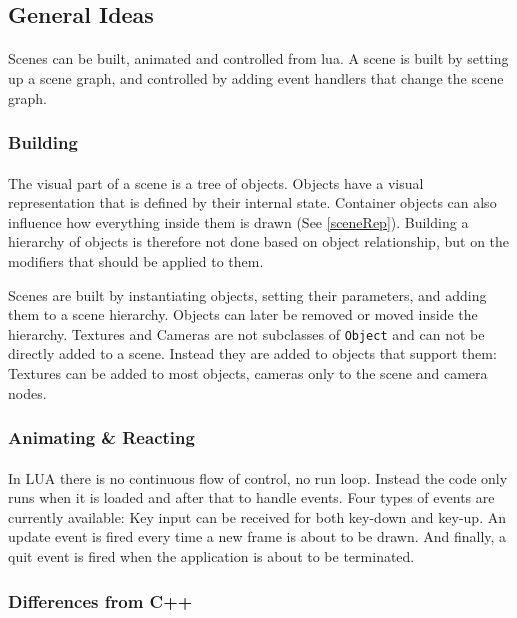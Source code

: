 \subsection{General Ideas}
\paragraph{}
Scenes can be built, animated and controlled from lua.
A scene is built by setting up a scene graph, and controlled by adding event handlers that change the scene graph.

\subsubsection{Building}
\paragraph{}
The visual part of a scene is a tree of objects.
Objects have a visual representation that is defined by their internal state.
Container objects can also influence how everything inside them is drawn (See \ref{sceneRep}).
Building a hierarchy of objects is therefore not done based on object relationship,
but on the modifiers that should be applied to them.

Scenes are built by instantiating objects, setting their parameters, and adding them to a scene hierarchy.
Objects can later be removed or moved inside the hierarchy.
Textures and Cameras are not subclasses of \lstinline{Object} and can not be directly added to a scene.
Instead they are added to objects that support them:
Textures can be added to most objects, cameras only to the scene and camera nodes.

\subsubsection{Animating \& Reacting}
\paragraph{}
In LUA there is no continuous flow of control, no run loop. Instead the code only runs when it is loaded and after that to handle events.
Four types of events are currently available: Key input can be received for both key-down and key-up. An update event is fired every time a new frame is about to be drawn. And finally, a quit event is fired when the application is about to be terminated.

\subsubsection{Differences from C++}
